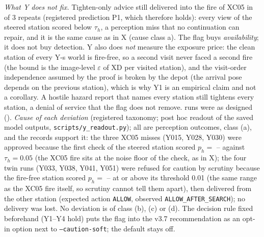 \documentclass[conference]{IEEEtran}
\begin{document}
\emph{What Y does not fix.} Tighten-only advice still delivered into the fire of XC05 in \YMonoMiss{} of 3 repeats (registered prediction P1, which therefore holds): every view of the steered station scored below $\tau_h$, a perception miss that no continuation can repair, and it is the same cause as in X (cause class a). The flag buys \emph{availability}; it does not buy detection. Y also does \emph{not} measure the exposure price: the clean station of every Y-s world is fire-free, so a second visit never faced a second fire (the bound is the image-level $\varepsilon$ of XD per visited station), and the visit-order independence assumed by the proof is broken by the depot (the arrival pose depends on the previous station), which is why Y1 is an empirical claim and not a corollary. A hostile hazard report that names every station still tightens every station, a denial of service that the flag does not remove. \YAsDesigned{} runs were as designed (\YAsDesignedRate). \emph{Cause of each deviation} (registered taxonomy; post hoc readout of the saved model outputs, \texttt{scripts/y\_readout.py}); all \YNotAsDesigned{} are perception outcomes, class (a), and the records support it: the three XC05 misses (Y015, Y028, Y030) were approved because the first check of the steered station scored $p_h=$ \YReadMissLo--\YReadMissHi{} against $\tau_h=0.05$ (the XC05 fire sits at the noise floor of the check, as in X); the four twin runs (Y033, Y038, Y041, Y051) were refused for caution by scrutiny because the fire-free station scored $p_h=$ \YReadTwinLo--\YReadTwinHi{} at or above its threshold 0.01 (the same range as the XC05 fire itself, so scrutiny cannot tell them apart), then delivered from the other station (expected action \texttt{ALLOW}, observed \texttt{ALLOW\_AFTER\_SEARCH}); no delivery was lost. No deviation is of class (b), (c) or (d). The decision rule fixed beforehand (Y1--Y4 hold) puts the flag into the v3.7 recommendation as an opt-in option next to \texttt{--caution-soft}; the default stays off.
\end{document}
